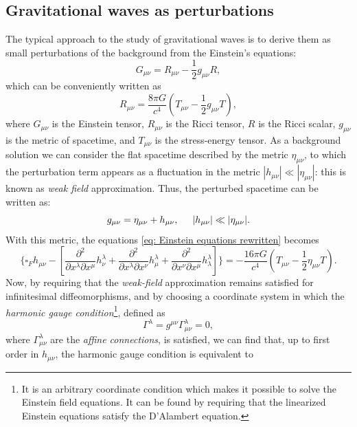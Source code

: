 \subsection{Gravitational waves as perturbations}
The typical approach to the study of gravitational waves is to derive them as small perturbations of the background from the Einstein's equations: 
\begin{equation}
    G_{\mu\nu} = R_{\mu\nu} - \frac{1}{2}g_{\mu\nu}R,
\end{equation}
which can be conveniently written as 
\begin{equation}
    R_{\mu\nu}=\frac{8\pi G}{c^4}\left(T_{\mu\nu} - \frac{1}{2}g_{\mu\nu}T\right),
    \label{eq: Einstein equations rewritten}
\end{equation}
where $G_{\mu\nu}$ is the Einstein tensor, $R_{\mu\nu}$ is the Ricci tensor, $R$ is the Ricci scalar, $g_{\mu\nu}$ is the metric of spacetime, and $T_{\mu\nu}$ is the stress-energy tensor.
As a background solution we can consider the flat spacetime described by the metric $\eta_{\mu\nu}$, to which the perturbation term appears as a fluctuation in the metric $|h_{\mu\nu}|\ll|\eta_{\mu\nu}|$: this is known as \textit{weak field} approximation.
Thus, the perturbed spacetime can be written as:
\[
    g_{\mu\nu} = \eta_{\mu\nu} + h_{\mu\nu}, \hspace{5mm}  |h_{\mu\nu}|\ll|\eta_{\mu\nu}|.
\] 
With this metric, the equations \ref{eq: Einstein equations rewritten} becomes
\[
    \{\square_F h_{\mu\nu} - \left[\frac{\partial^2}{\partial x^\lambda\partial x^\mu}h^\lambda_\nu + \frac{\partial^2}{\partial x^\lambda\partial x^\nu}h^\lambda_\mu + \frac{\partial^2}{\partial x^\nu\partial x^\mu}h^\lambda_\lambda\right]\} = -\frac{16\pi G}{c^4}\left(T_{\mu\nu} - \frac{1}{2}\eta_{\mu\nu}T\right).
\]
Now, by requiring that the \textit{weak-field} approximation remains satisfied for infinitesimal diffeomorphisms, and by choosing a coordinate system in which the \textit{harmonic gauge condition}\footnote{It is an arbitrary coordinate condition which makes it possible to solve the Einstein field equations. It can be found by requiring that the linearized Einstein equations satisfy the D'Alambert equation.}, defined as 
\begin{equation}
    \Gamma^\lambda = g^{\mu\nu}\Gamma^\lambda_{\mu\nu} = 0,
    \label{eq: Harmonic gauge definition}
\end{equation}
where $\Gamma^\lambda_{\mu\nu}$ are the \textit{affine connections}, is satisfied, we can find that, up to first order in $h_{\mu\nu}$, the harmonic gauge condition is equivalent to 
